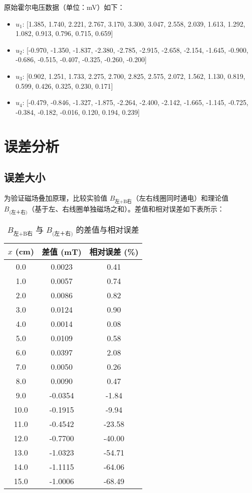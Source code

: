 \documentclass[12pt]{article}
\begin{document}
\begin{CJK}{UTF8}{gbsn}
原始霍尔电压数据（单位：mV）如下：
\begin{itemize}
    \item \( u_1 \): [1.385, 1.740, 2.221, 2.767, 3.170, 3.300, 3.047, 2.558, 2.039, 1.613, 1.292, 1.082, 0.913, 0.796, 0.715, 0.659]
    \item \( u_2 \): [-0.970, -1.350, -1.837, -2.380, -2.785, -2.915, -2.658, -2.154, -1.645, -0.900, -0.686, -0.515, -0.407, -0.325, -0.260, -0.200]
    \item \( u_3 \): [0.902, 1.251, 1.733, 2.275, 2.700, 2.825, 2.575, 2.072, 1.562, 1.130, 0.819, 0.599, 0.426, 0.325, 0.230, 0.171]
    \item \( u_4 \): [-0.479, -0.846, -1.327, -1.875, -2.264, -2.400, -2.142, -1.665, -1.145, -0.725, -0.384, -0.182, -0.016, 0.120, 0.194, 0.239]
\end{itemize}

\section{误差分析}

\subsection{误差大小}
为验证磁场叠加原理，比较实验值 \( B_{\text{左+B右}} \)（左右线圈同时通电）和理论值 \( B_{\text{(左＋右)}} \)（基于左、右线圈单独磁场之和）。差值和相对误差如下表所示：

\begin{table}[h]
\centering
\caption{\( B_{\text{左+B右}} \) 与 \( B_{\text{(左＋右)}} \) 的差值与相对误差}
\begin{tabular}{ccc}
\toprule
\( x \) (cm) & 差值 (mT) & 相对误差 (\%) \\
\midrule
0.0 & 0.0023 & 0.41 \\
1.0 & 0.0057 & 0.74 \\
2.0 & 0.0086 & 0.82 \\
3.0 & 0.0124 & 0.90 \\
4.0 & 0.0014 & 0.08 \\
5.0 & 0.0109 & 0.58 \\
6.0 & 0.0397 & 2.08 \\
7.0 & 0.0050 & 0.26 \\
8.0 & 0.0090 & 0.47 \\
9.0 & -0.0354 & -1.84 \\
10.0 & -0.1915 & -9.94 \\
11.0 & -0.4542 & -23.58 \\
12.0 & -0.7700 & -40.00 \\
13.0 & -1.0323 & -54.71 \\
14.0 & -1.1115 & -64.06 \\
15.0 & -1.0006 & -68.49 \\
\bottomrule
\end{tabular}
\end{table}


\end{CJK}
\end{document}
